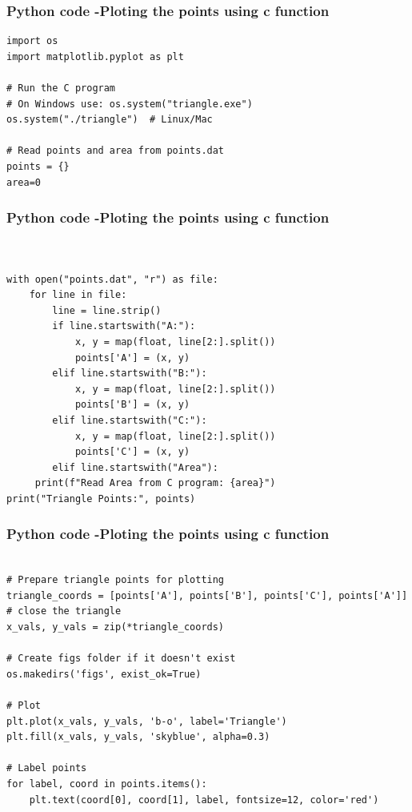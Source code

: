 \documentclass{beamer}
\begin{document}
	
\begin{frame}[fragile]                              
	\frametitle{Python code -Ploting the points using c function} 
	\begin{lstlisting}
import os
import matplotlib.pyplot as plt

# Run the C program
# On Windows use: os.system("triangle.exe")
os.system("./triangle")  # Linux/Mac

# Read points and area from points.dat
points = {}
area=0
	\end{lstlisting}
\end{frame}

	
\begin{frame}[fragile]                              
	\frametitle{Python code -Ploting the points using c function} 
	\begin{lstlisting}


with open("points.dat", "r") as file:
    for line in file:
        line = line.strip()
        if line.startswith("A:"):
            x, y = map(float, line[2:].split())
            points['A'] = (x, y)
        elif line.startswith("B:"):
            x, y = map(float, line[2:].split())
            points['B'] = (x, y)
        elif line.startswith("C:"):
            x, y = map(float, line[2:].split())
            points['C'] = (x, y)
        elif line.startswith("Area"):
     print(f"Read Area from C program: {area}")
print("Triangle Points:", points)
\end{lstlisting}
\end{frame}

	
\begin{frame}[fragile]                              
	\frametitle{Python code -Ploting the points using c function} 
	\begin{lstlisting}

# Prepare triangle points for plotting
triangle_coords = [points['A'], points['B'], points['C'], points['A']]  # close the triangle
x_vals, y_vals = zip(*triangle_coords)

# Create figs folder if it doesn't exist
os.makedirs('figs', exist_ok=True)

# Plot
plt.plot(x_vals, y_vals, 'b-o', label='Triangle')
plt.fill(x_vals, y_vals, 'skyblue', alpha=0.3)

# Label points
for label, coord in points.items():
    plt.text(coord[0], coord[1], label, fontsize=12, color='red')
\end{lstlisting}
\end{frame}
\end{document}
